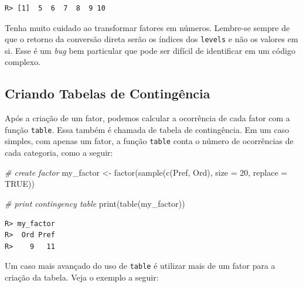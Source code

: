 \documentclass[
  11pt,
]{book}
\newenvironment{Shaded}{\begin{snugshade}}{\end{snugshade}}
\newcommand{\AttributeTok}[1]{\textcolor[rgb]{0.61,0.61,0.61}{#1}}
\newcommand{\CommentTok}[1]{\textcolor[rgb]{0.37,0.37,0.37}{\textit{#1}}}
\newcommand{\ConstantTok}[1]{\textcolor[rgb]{0,0,0}{#1}}
\newcommand{\DecValTok}[1]{\textcolor[rgb]{0.06,0.06,0.06}{#1}}
\newcommand{\FunctionTok}[1]{\textcolor[rgb]{0,0,0}{#1}}
\newcommand{\NormalTok}[1]{#1}
\newcommand{\OtherTok}[1]{\textcolor[rgb]{0.37,0.37,0.37}{#1}}
\newcommand{\StringTok}[1]{\textcolor[rgb]{0.5,0.5,0.5}{#1}}
\newenvironment{rmdcaution}
{\begin{cautionblock}

} {\end{cautionblock}}
\begin{document}
\begin{verbatim}
R> [1]  5  6  7  8  9 10
\end{verbatim}

\begin{rmdcaution}
Tenha muito cuidado ao transformar fatores em números. Lembre-se sempre
de que o retorno da conversão direta serão os índices dos
\texttt{levels} e não os valores em si. Esse é um \emph{bug} bem
particular que pode ser difícil de identificar em um código complexo.
\end{rmdcaution}

\hypertarget{criando-tabelas-de-continguxeancia}{%
\subsection{Criando Tabelas de Contingência}\label{criando-tabelas-de-continguxeancia}}

Após a criação de um fator, podemos calcular a ocorrência de cada fator com a função \texttt{table}. Essa também é chamada de tabela de contingência. Em um caso simples, com apenas um fator, a função \texttt{table} conta o número de ocorrências de cada categoria, como a seguir:

\begin{Shaded}
\begin{Highlighting}[]
\CommentTok{\# create factor}
\NormalTok{my\_factor }\OtherTok{\textless{}{-}} \FunctionTok{factor}\NormalTok{(}\FunctionTok{sample}\NormalTok{(}\FunctionTok{c}\NormalTok{(}\StringTok{\textquotesingle{}Pref\textquotesingle{}}\NormalTok{, }\StringTok{\textquotesingle{}Ord\textquotesingle{}}\NormalTok{),}
                           \AttributeTok{size =} \DecValTok{20}\NormalTok{,}
                           \AttributeTok{replace =} \ConstantTok{TRUE}\NormalTok{))}

\CommentTok{\# print contingency table}
\FunctionTok{print}\NormalTok{(}\FunctionTok{table}\NormalTok{(my\_factor))}
\end{Highlighting}
\end{Shaded}

\begin{verbatim}
R> my_factor
R>  Ord Pref 
R>    9   11
\end{verbatim}

Um caso mais avançado do uso de \texttt{table} é utilizar mais de um fator para a criação da tabela. Veja o exemplo a seguir:
\end{document}
